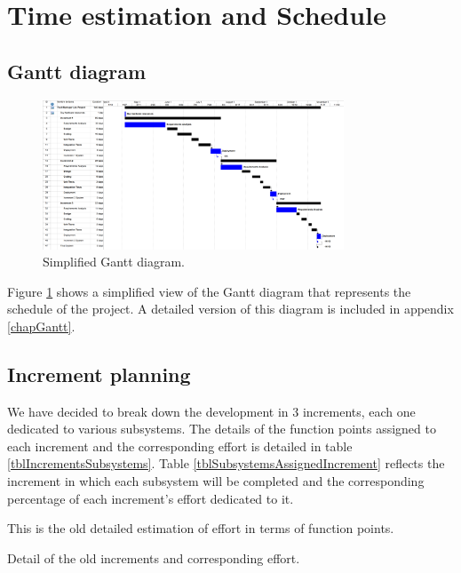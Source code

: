 \section{Time estimation and Schedule}
\label{secTimeEstimation}
\subsection{Gantt diagram}

\begin{figure}[hbtp]
\centering
\includegraphics[width=0.8\textwidth]{img/GanttDiagram.png}
\caption{Simplified Gantt diagram.}
\label{figGanttSimple}
\end{figure}

Figure \ref{figGanttSimple} shows a simplified view of the Gantt diagram that represents the schedule of the project. A detailed version of this diagram is included in appendix \ref{chapGantt}.

\subsection{Increment planning}

We have decided to break down the development in 3 increments, each one dedicated to various subsystems. The details of the function points assigned to each increment and the corresponding effort is detailed in table \ref{tblIncrementsSubsystems}. Table \ref{tblSubsystemsAssignedIncrement} reflects the increment in which each subsystem will be completed and the corresponding percentage of each increment's effort dedicated to it.

This is the old detailed estimation of effort in terms of function points.

\begin{table}[hbtp]
\centering

\caption{Detail of the old increments and corresponding effort.}
\label{tblIncrementsSubsystems}
\end{table}


